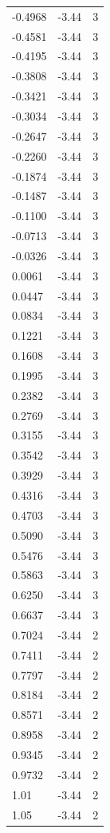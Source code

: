\begin{longtable}{lrr}
  -0.4968 & -3.44 & 3 \\
  -0.4581 & -3.44 & 3 \\
  -0.4195 & -3.44 & 3 \\
  -0.3808 & -3.44 & 3 \\
  -0.3421 & -3.44 & 3 \\
  -0.3034 & -3.44 & 3 \\
  -0.2647 & -3.44 & 3 \\
  -0.2260 & -3.44 & 3 \\
  -0.1874 & -3.44 & 3 \\
  -0.1487 & -3.44 & 3 \\
  -0.1100 & -3.44 & 3 \\
  -0.0713 & -3.44 & 3 \\
  -0.0326 & -3.44 & 3 \\
  0.0061 & -3.44 & 3 \\
  0.0447 & -3.44 & 3 \\
  0.0834 & -3.44 & 3 \\
  0.1221 & -3.44 & 3 \\
  0.1608 & -3.44 & 3 \\
  0.1995 & -3.44 & 3 \\
  0.2382 & -3.44 & 3 \\
  0.2769 & -3.44 & 3 \\
  0.3155 & -3.44 & 3 \\
  0.3542 & -3.44 & 3 \\
  0.3929 & -3.44 & 3 \\
  0.4316 & -3.44 & 3 \\
  0.4703 & -3.44 & 3 \\
  0.5090 & -3.44 & 3 \\
  0.5476 & -3.44 & 3 \\
  0.5863 & -3.44 & 3 \\
  0.6250 & -3.44 & 3 \\
  0.6637 & -3.44 & 3 \\
  0.7024 & -3.44 & 2 \\
  0.7411 & -3.44 & 2 \\
  0.7797 & -3.44 & 2 \\
  0.8184 & -3.44 & 2 \\
  0.8571 & -3.44 & 2 \\
  0.8958 & -3.44 & 2 \\
  0.9345 & -3.44 & 2 \\
  0.9732 & -3.44 & 2 \\
  1.01 & -3.44 & 2 \\
  1.05 & -3.44 & 2 \\

\end{longtable}
